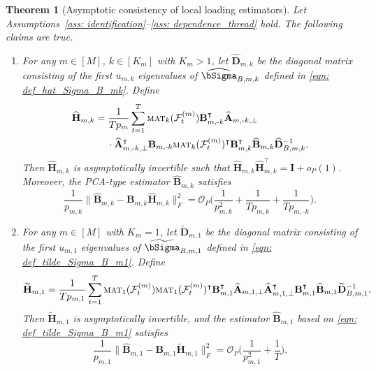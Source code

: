 \documentclass[aos]{imsart}
\theoremstyle{plain}
\newtheorem{theorem}{Theorem}[section]
\theoremstyle{definition}
\def\mat{\textnormal{\textsc{mat}}}
\def\wt#1{\widetilde{#1}}
\def\wh#1{\widehat{#1}}
\def\cF{\mathcal{F}}
\def\cO{\mathcal{O}}
\def\bI{\mathbf{I}}
\def\bA{\mathbf{A}}
\def\bB{\mathbf{B}}
\def\bD{\mathbf{D}}
\def\bH{\mathbf{H}}
\def\trans{\intercal}
\begin{document}
\begin{theorem}[Asymptotic consistency of local loading estimators]\label{thm: local_loading}
Let Assumptions~\ref{ass: identification}--\ref{ass: dependence_thread} hold. The following claims are true.
\begin{enumerate}[itemsep=0pt, label = (\alph*), left = 0pt]
    \item For any $m\in[M]$, $k\in[K_m]$ with $K_m> 1$, let $\wh{\bD}_{m,k}$ be the diagonal matrix consisting of the first $u_{m,k}$ eigenvalues of $\wh\bSigma_{B,m,k}$ defined in \eqref{eqn: def_hat_Sigma_B_mk}. Define
    \begin{align*}
        \wh{\bH}_{m,k} &= \frac{1}{Tp_m} \sum_{t=1}^T \mat_k(\cF_t^{(m)}) \bB_{m,\text{-}k}^\trans \wh{\bA}_{m,\text{-}k,\perp} \\
        &\;\quad
        \cdot \wh{\bA}_{m,\text{-}k,\perp}^\trans \bB_{m,\text{-}k} \mat_k(\cF_t^{(m)})^\trans \bB_{m,k}^\trans \wh{\bB}_{m,k} \wh{\bD}_{B,m,k}^{-1} .
    \end{align*}
    Then $\wh{\bH}_{m,k}$ is asymptotically invertible such that $\wh{\bH}_{m,k} \wh{\bH}_{m,k}^\trans = \bI + o_P(1)$. Moreover, the PCA-type estimator $\wh{\bB}_{m,k}$ satisfies
    \[
    \frac{1}{p_{m,k}} \Big\| \wh{\bB}_{m,k} - \bB_{m,k} \wh{\bH}_{m,k} \Big\|_F^2 = \cO_P\Big( \frac{1}{p_{m,k}^2} + \frac{1}{T p_{m,k}} + \frac{1}{T p_{m,\text{-}k}} \Big) .
    \]
    \item For any $m\in[M]$ with $K_m= 1$, let $\wt{\bD}_{m,1}$ be the diagonal matrix consisting of the first $u_{m,1}$ eigenvalues of $\wt\bSigma_{B,m,1}$ defined in \eqref{eqn: def_tilde_Sigma_B_m1}. Define
    \[
    \wt{\bH}_{m,1} = \frac{1}{Tp_{m,1}} \sum_{t=1}^T \mat_1(\cF_t^{(m)}) \mat_1(\cF_t^{(m)})^\trans \bB_{m,1}^\trans \wh{\bA}_{m,1,\perp} \wh{\bA}_{m,1,\perp}^\trans \bB_{m,1}^\trans \wh{\bB}_{m,1} \wt{\bD}_{B,m,1}^{-1} .
    \]
    Then $\wt{\bH}_{m,1}$ is asymptotically invertible, and the estimator $\wh{\bB}_{m,1}$ based on \eqref{eqn: def_tilde_Sigma_B_m1} satisfies
    \[
    \frac{1}{p_{m,1}} \Big\| \wh{\bB}_{m,1} - \bB_{m,1} \wt{\bH}_{m,1} \Big\|_F^2 = \cO_P\Big( \frac{1}{p_{m,1}^2} + \frac{1}{T} \Big) .
    \]
\end{enumerate}
\end{theorem}
\end{document}
